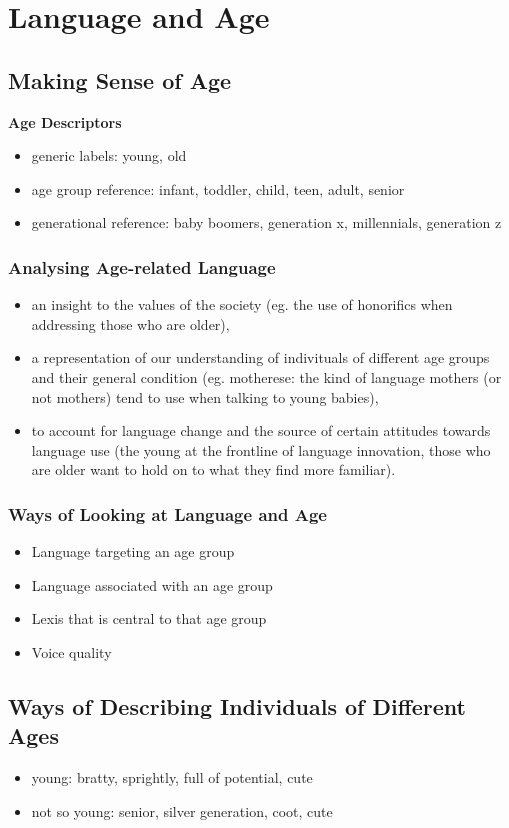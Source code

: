\documentclass[../main.tex]{subfiles}
\begin{document}
\section{Language and Age}

\subsection{Making Sense of Age}
\textbf{Age Descriptors} \begin{itemize}
	\item generic labels: young, old
	\item age group reference: infant, toddler, child, teen, adult, senior
	\item generational reference: baby boomers, generation x, millennials, generation z
\end{itemize}

\subsubsection{Analysing Age-related Language}
\begin{itemize}
	\item an insight to the values of the society (eg. the use of honorifics when addressing those who are older),
	\item a representation of our understanding of indivituals of different age groups and their general condition (eg. motherese: the kind of language mothers (or not mothers) tend to use when talking to young babies),
	\item to account for language change and the source of certain attitudes towards language use (the young at the frontline of language innovation, those who are older want to hold on to what they find more familiar). 
\end{itemize}

\subsubsection{Ways of Looking at Language and Age}
\begin{itemize}
	\item Language targeting an age group
	\item Language associated with an age group
	\item Lexis that is central to that age group
	\item Voice quality
\end{itemize}

\subsection{Ways of Describing Individuals of Different Ages}
\begin{itemize}
	\item young: bratty, sprightly, full of potential, cute
	\item not so young: senior, silver generation, coot, cute
\end{itemize}
\end{document}
